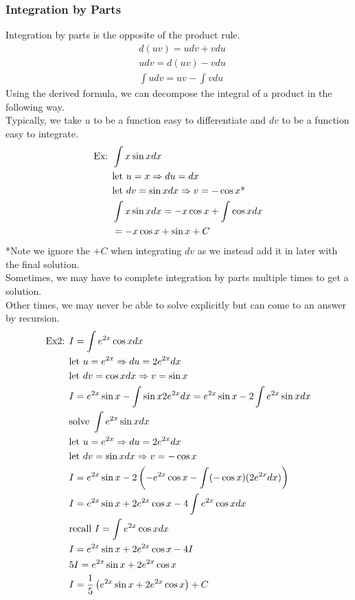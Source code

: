 \documentclass[11pt, fleqn]{article}
\begin{document}
\subsubsection{Integration by Parts}
Integration by parts is the opposite of the product rule.
\begin{align*}
    &d(uv)=udv+vdu\\
    &udv=d(uv)-vdu\\
    &\int udv=uv-\int vdu
\end{align*}
Using the derived formula, we can decompose the integral of a product in the following way.\\
Typically, we take $u$ to be a function easy to differentiate and $dv$ to be a function easy to integrate.
\begin{align*}
    \text{Ex: }&\int x\sin xdx\\
    &\text{let }u=x\Rightarrow du=dx\\
    &\text{let }dv=\sin xdx\Rightarrow v=-\cos x\text{*}\\
    &\int x\sin xdx=-x\cos x+\int \cos xdx\\
    &=-x\cos x+\sin x+C
\end{align*}
*Note we ignore the $+C$ when integrating $dv$ as we instead add it in later with the final solution.\\
Sometimes, we may have to complete integration by parts multiple times to get a solution.\\
Other times, we may never be able to solve explicitly but can come to an answer by recursion.
\begin{align*}
    \text{Ex2: }&I=\int e^{2x}\cos x dx\\
    &\text{let }u=e^{2x}\Rightarrow du=2e^{2x}dx\\
    &\text{let }dv=\cos xdx\Rightarrow v=\sin x\\
    &I=e^{2x}\sin x-\int \sin x2e^{2x}dx=e^{2x}\sin x-2\int e^{2x}\sin x dx\\
    &\text{solve }\int e^{2x}\sin xdx\\
    &\text{let }u=e^{2x}\Rightarrow du=2e^{2x}dx\\
    &\text{let }dv=\sin xdx\Rightarrow v=-\cos x\\
    &I=e^{2x}\sin x-2\left( -e^{2x}\cos x-\int (-\cos x)(2e^{2x}dx) \right)\\
    &I=e^{2x}\sin x+2e^{2x}\cos x-4\int e^{2x}\cos xdx\\
    &\text{recall }I=\int e^{2x}\cos x dx\\
    &I=e^{2x}\sin x+2e^{2x}\cos x-4I\\
    &5I=e^{2x}\sin x+2e^{2x}\cos x\\
    &I=\frac{1}{5}\left( e^{2x}\sin x+2e^{2x}\cos x \right)+C
\end{align*}
\end{document}

